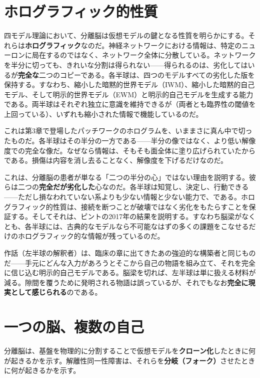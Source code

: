 \documentclass[11pt, twoside, openright]{book}
\begin{document}
\section*{ホログラフィック的性質}

四モデル理論において、分離脳は仮想モデルの鍵となる性質を明らかにする。それらは\textbf{ホログラフィック}なのだ。神経ネットワークにおける情報は、特定のニューロンに局在するのではなく、ネットワーク全体に分散している。ネットワークを半分に切っても、きれいな分割は得られない------得られるのは、劣化してはいるが\textbf{完全な}二つのコピーである。各半球は、四つのモデルすべての劣化した版を保持する。すなわち、縮小した暗黙的世界モデル（IWM）、縮小した暗黙的自己モデル、そして明示的世界モデル（EWM）と明示的自己モデルを生成する能力である。両半球はそれぞれ独立に意識を維持できるが（両者とも臨界性の閾値を上回っている）、いずれも縮小された情報で機能しているのだ。

これは第3章で登場したパッチワークのホログラムを、いままさに真ん中で切ったものだ。各半球はその半分の一方である------半分の像ではなく、より低い解像度での完全な像だ。なぜなら情報は、そもそも面全体に塗り広げられていたからである。損傷は内容を消し去ることなく、解像度を下げるだけなのだ。

これは、分離脳の患者が単なる「二つの半分の心」ではない理由を説明する。彼らは二つの\textbf{完全だが劣化した}心なのだ。各半球は知覚し、決定し、行動できる------ただし損なわれていない系よりも少ない情報と少ない能力で、である。ホログラフィック的性質は、接続を断つことが破壊ではなく劣化をもたらすことを保証する。そしてそれは、ピントの2017年の結果を説明する。すなわち脳梁がなくとも、各半球には、古典的なモデルなら不可能なはずの多くの課題をこなせるだけのホログラフィック的な情報が残っているのだ。

作話（左半球の解釈者）は、臨床の章に出てきたあの強迫的な構築者と同じものだ------手元にどんな入力があろうとそこから自己の物語を組み立て、それを完全に信じ込む明示的自己モデルである。脳梁を切れば、左半球は単に扱える材料が減る。隙間を覆うために発明される物語は誤っているが、それでもなお\textbf{完全に現実として感じられる}のである。

\section*{一つの脳、複数の自己}

分離脳は、基盤を物理的に分割することで仮想モデルを\textbf{クローン化}したときに何が起きるかを示す。解離性同一性障害は、それらを\textbf{分岐（フォーク）}させたときに何が起きるかを示す。
\end{document}
